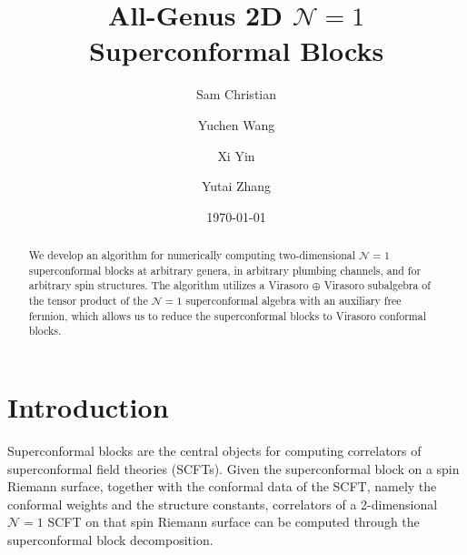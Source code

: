 \documentclass[aps,10pt,twocolumn,superscriptaddress]{revtex4-2}
\begin{document}
\title{All-Genus 2D \texorpdfstring{$\mathcal{N}=1$}{N=1} Superconformal Blocks}

\author{Sam Christian}
\author{Yuchen Wang}
\author{Xi Yin}
\author{Yutai Zhang}

\date{\today}

\begin{abstract}
We develop an algorithm for numerically computing two-dimensional $\mathcal{N}=1$ superconformal blocks at arbitrary genera, in arbitrary plumbing channels, and for arbitrary spin structures. The algorithm utilizes a Virasoro $\oplus$ Virasoro subalgebra of the tensor product of the $\mathcal{N}=1$ superconformal algebra with an auxiliary free fermion, which allows us to reduce the superconformal blocks to Virasoro conformal blocks.
\end{abstract}

\maketitle

\section{Introduction}

Superconformal blocks are the central objects for computing correlators of superconformal field theories (SCFTs). Given the superconformal block on a spin Riemann surface, together with the conformal data of the SCFT, namely the conformal weights and the structure constants, correlators of a 2-dimensional $\mathcal{N}=1$ SCFT on that spin Riemann surface can be computed through the superconformal block decomposition. 
\end{document}
